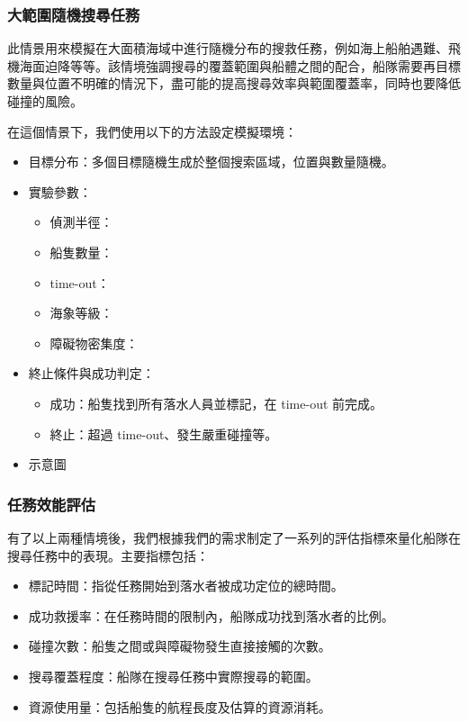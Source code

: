 \documentclass[12pt,a4paper]{ctexart}
\begin{document}
\subsubsection{大範圍隨機搜尋任務}
此情景用來模擬在大面積海域中進行隨機分布的搜救任務，例如海上船舶遇難、飛機海面迫降等等。該情境強調搜尋的覆蓋範圍與船體之間的配合，船隊需要再目標數量與位置不明確的情況下，盡可能的提高搜尋效率與範圍覆蓋率，同時也要降低碰撞的風險。
\\ \par
在這個情景下，我們使用以下的方法設定模擬環境：
\begin{itemize}
    \item 目標分布：多個目標隨機生成於整個搜索區域，位置與數量隨機。
    \item 實驗參數：
    \begin{itemize}
        \item 偵測半徑：
        \item 船隻數量：
        \item time-out：
        \item 海象等級：
        \item 障礙物密集度：
    \end{itemize}
    \item 終止條件與成功判定：
    \begin{itemize}
        \item 成功：船隻找到所有落水人員並標記，在 time-out 前完成。
        \item 終止：超過 time-out、發生嚴重碰撞等。
    \end{itemize}
    \item 示意圖
\end{itemize}

\subsubsection{任務效能評估}
有了以上兩種情境後，我們根據我們的需求制定了一系列的評估指標來量化船隊在搜尋任務中的表現。主要指標包括：
\begin{itemize}
    \item 標記時間：指從任務開始到落水者被成功定位的總時間。
    \item 成功救援率：在任務時間的限制內，船隊成功找到落水者的比例。
    \item 碰撞次數：船隻之間或與障礙物發生直接接觸的次數。
    \item 搜尋覆蓋程度：船隊在搜尋任務中實際搜尋的範圍。
    \item 資源使用量：包括船隻的航程長度及估算的資源消耗。
\end{itemize}
\end{document}
